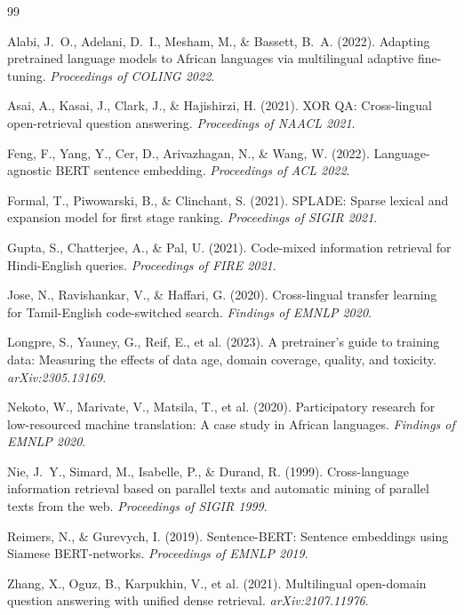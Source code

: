 \documentclass[11pt,a4paper]{article}
\begin{document}

\begin{thebibliography}{99}

Alabi, J.~O., Adelani, D.~I., Mesham, M., \& Bassett, B.~A. (2022).
Adapting pretrained language models to African languages via multilingual
adaptive fine-tuning.
\textit{Proceedings of COLING 2022}.

Asai, A., Kasai, J., Clark, J., \& Hajishirzi, H. (2021).
XOR QA: Cross-lingual open-retrieval question answering.
\textit{Proceedings of NAACL 2021}.

Feng, F., Yang, Y., Cer, D., Arivazhagan, N., \& Wang, W. (2022).
Language-agnostic BERT sentence embedding.
\textit{Proceedings of ACL 2022}.

Formal, T., Piwowarski, B., \& Clinchant, S. (2021).
SPLADE: Sparse lexical and expansion model for first stage ranking.
\textit{Proceedings of SIGIR 2021}.

Gupta, S., Chatterjee, A., \& Pal, U. (2021).
Code-mixed information retrieval for Hindi-English queries.
\textit{Proceedings of FIRE 2021}.

Jose, N., Ravishankar, V., \& Haffari, G. (2020).
Cross-lingual transfer learning for Tamil-English code-switched search.
\textit{Findings of EMNLP 2020}.

Longpre, S., Yauney, G., Reif, E., et al. (2023).
A pretrainer's guide to training data: Measuring the effects of data age,
domain coverage, quality, and toxicity.
\textit{arXiv:2305.13169}.

Nekoto, W., Marivate, V., Matsila, T., et al. (2020).
Participatory research for low-resourced machine translation: A case study
in African languages.
\textit{Findings of EMNLP 2020}.

Nie, J.~Y., Simard, M., Isabelle, P., \& Durand, R. (1999).
Cross-language information retrieval based on parallel texts and automatic
mining of parallel texts from the web.
\textit{Proceedings of SIGIR 1999}.

Reimers, N., \& Gurevych, I. (2019).
Sentence-BERT: Sentence embeddings using Siamese BERT-networks.
\textit{Proceedings of EMNLP 2019}.

Zhang, X., Oguz, B., Karpukhin, V., et al. (2021).
Multilingual open-domain question answering with unified dense retrieval.
\textit{arXiv:2107.11976}.

\end{thebibliography}
\end{document}
